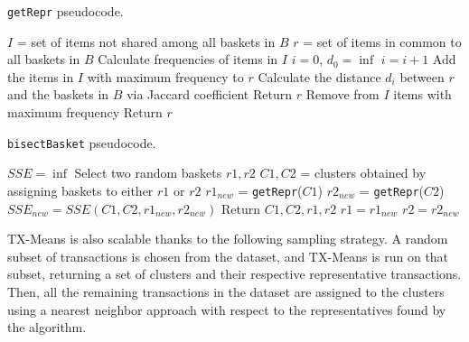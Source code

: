 \begin{algorithm}[H]
\caption{\texttt{getRepr} pseudocode.}
\begin{algorithmic}[1]
    \State $I$ = set of items not shared among all baskets in $B$
    \State $r$ = set of items in common to all baskets in $B$
    \State Calculate frequencies of items in $I$
    \State $i = 0$, $d_0 = \inf$
        \State $i = i + 1$
        \State Add the items in $I$ with maximum frequency to $r$
        \State Calculate the distance $d_i$ between $r$ and the baskets in $B$ via Jaccard coefficient
            \State Return $r$
        \Else
            \State Remove from $I$ items with maximum frequency
        \EndIf
    \EndWhile 
    \State Return $r$
\end{algorithmic}

\end{algorithm}
\begin{algorithm}
\caption{\texttt{bisectBasket} pseudocode.}
\begin{algorithmic}[1]
    \State $SSE = \inf$
    \State Select two random baskets $r1,r2$
        \State $C1,C2$ = clusters obtained by assigning baskets to either $r1$ or $r2$
        \State $r1_{new}$ = \texttt{getRepr}($C1$)
        \State $r2_{new}$ = \texttt{getRepr}($C2$)
        \State $SSE_{new} = SSE(C1,C2,r1_{new},r2_{new})$
            \State Return $C1,C2,r1,r2$
        \EndIf
        \State $r1 = r1_{new}$
        \State $r2 = r2_{new}$
    \EndWhile
\end{algorithmic}
\end{algorithm}
TX-Means is also scalable thanks to the following sampling strategy. A random subset of transactions is chosen from the dataset, and TX-Means is run on that subset, returning a set of clusters and their respective representative transactions. Then, all the remaining transactions in the dataset are assigned to the clusters using a nearest neighbor approach with respect to the representatives found by the algorithm.